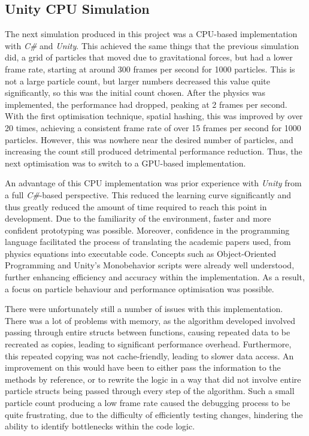 \documentclass[12pt]{article}
\begin{document}
    \subsection{Unity CPU Simulation}

    The next simulation produced in this project was a CPU-based implementation with \textit{C\#} and \textit{Unity}. This achieved the same things that the previous simulation did, a grid of particles that moved due to gravitational forces, but had a lower frame rate, starting at around 300 frames per second for 1000 particles. This is not a large particle count, but larger numbers decreased this value quite significantly, so this was the initial count chosen. After the physics was implemented, the performance had dropped, peaking at 2 frames per second. With the first optimisation technique, spatial hashing, this was improved by over 20 times, achieving a consistent frame rate of over 15 frames per second for 1000 particles. However, this was nowhere near the desired number of particles, and increasing the count still produced detrimental performance reduction. Thus, the next optimisation was to switch to a GPU-based implementation.

    An advantage of this CPU implementation was prior experience with \textit{Unity} from a full \textit{C\#}-based perspective. This reduced the learning curve significantly and thus greatly reduced the amount of time required to reach this point in development. Due to the familiarity of the environment, faster and more confident prototyping was possible. Moreover, confidence in the programming language facilitated the process of translating the academic papers used, from physics equations into executable code. Concepts such as Object-Oriented Programming and Unity's Monobehavior scripts were already well understood, further enhancing efficiency and accuracy within the implementation. As a result, a focus on particle behaviour and performance optimisation was possible.

    There were unfortunately still a number of issues with this implementation. There was a lot of problems with memory, as the algorithm developed involved passing through entire structs between functions, causing repeated data to be recreated as copies, leading to significant performance overhead. Furthermore, this repeated copying was not cache-friendly, leading to slower data access. An improvement on this would have been to either pass the information to the methods by reference, or to rewrite the logic in a way that did not involve entire particle structs being passed through every step of the algorithm. Such a small particle count producing a low frame rate caused the debugging process to be quite frustrating, due to the difficulty of efficiently testing changes, hindering the ability to identify bottlenecks within the code logic. 
    
\end{document}
